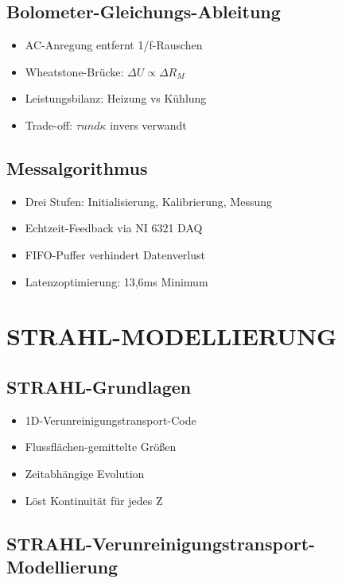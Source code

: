 \documentclass[11pt,a4paper]{article}
\begin{document}
\subsection{Bolometer-Gleichungs-Ableitung}

\begin{itemize}
\item AC-Anregung entfernt 1/f-Rauschen
\item Wheatstone-Brücke: $\Delta U \propto \Delta R_M $
\item Leistungsbilanz: Heizung vs Kühlung
\item Trade-off: $\tau und \kappa $ invers verwandt
\end{itemize}

\subsection{Messalgorithmus}

\begin{itemize}
\item Drei Stufen: Initialisierung, Kalibrierung, Messung
\item Echtzeit-Feedback via NI 6321 DAQ
\item FIFO-Puffer verhindert Datenverlust
\item Latenzoptimierung: 13,6ms Minimum
\end{itemize}

\section{STRAHL-MODELLIERUNG}

\subsection{STRAHL-Grundlagen}

\begin{itemize}
\item 1D-Verunreinigungstransport-Code
\item Flussflächen-gemittelte Größen
\item Zeitabhängige Evolution
\item Löst Kontinuität für jedes Z
\end{itemize}

\subsection{STRAHL-Verunreinigungstransport-Modellierung}
\end{document}
